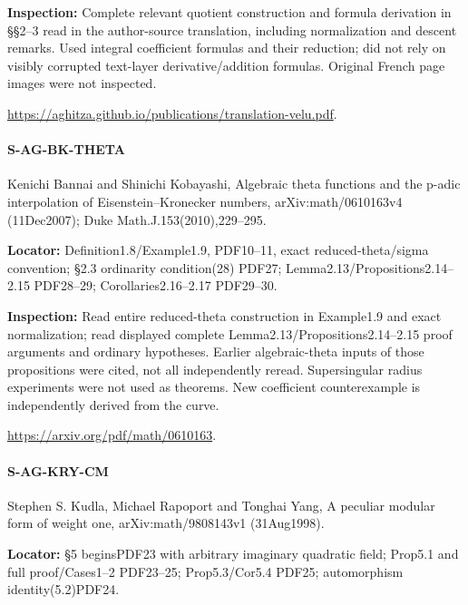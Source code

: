 \documentclass[11pt,a4paper]{article}
\begin{document}
\textbf{Inspection:} Complete relevant quotient construction and formula derivation in §§2–\allowbreak{}3 read in the author-source translation, including normalization and descent remarks.\allowbreak{} Used integral coefficient formulas and their reduction; did not rely on visibly corrupted text-layer derivative/\allowbreak{}addition formulas.\allowbreak{} Original French page images were not inspected.\allowbreak{}

\url{https://aghitza.github.io/publications/translation-velu.pdf}.

\paragraph{S-AG-BK-THETA} Kenichi Bannai and Shinichi Kobayashi, Algebraic theta functions and the p-adic interpolation of Eisenstein–\allowbreak{}Kronecker numbers, arXiv:\allowbreak{}math/\allowbreak{}0610163v4 (11Dec2007); Duke Math.\allowbreak{}J.\allowbreak{}153(2010),229–\allowbreak{}295.

\textbf{Locator:} Definition1.\allowbreak{}8/\allowbreak{}Example1.\allowbreak{}9, PDF10–\allowbreak{}11, exact reduced-theta/\allowbreak{}sigma convention; §2.\allowbreak{}3 ordinarity condition(28) PDF27; Lemma2.\allowbreak{}13/\allowbreak{}Propositions2.\allowbreak{}14–\allowbreak{}2.\allowbreak{}15 PDF28–\allowbreak{}29; Corollaries2.\allowbreak{}16–\allowbreak{}2.\allowbreak{}17 PDF29–\allowbreak{}30.

\textbf{Inspection:} Read entire reduced-theta construction in Example1.\allowbreak{}9 and exact normalization; read displayed complete Lemma2.\allowbreak{}13/\allowbreak{}Propositions2.\allowbreak{}14–\allowbreak{}2.\allowbreak{}15 proof arguments and ordinary hypotheses.\allowbreak{} Earlier algebraic-theta inputs of those propositions were cited, not all independently reread.\allowbreak{} Supersingular radius experiments were not used as theorems.\allowbreak{} New coefficient counterexample is independently derived from the curve.\allowbreak{}

\url{https://arxiv.org/pdf/math/0610163}.

\paragraph{S-AG-KRY-CM} Stephen S.\allowbreak{} Kudla, Michael Rapoport and Tonghai Yang, A peculiar modular form of weight one, arXiv:\allowbreak{}math/\allowbreak{}9808143v1 (31Aug1998).

\textbf{Locator:} §5 beginsPDF23 with arbitrary imaginary quadratic field; Prop5.\allowbreak{}1 and full proof/\allowbreak{}Cases1–\allowbreak{}2 PDF23–\allowbreak{}25; Prop5.\allowbreak{}3/\allowbreak{}Cor5.\allowbreak{}4 PDF25; automorphism identity(5.\allowbreak{}2)PDF24.
\end{document}
